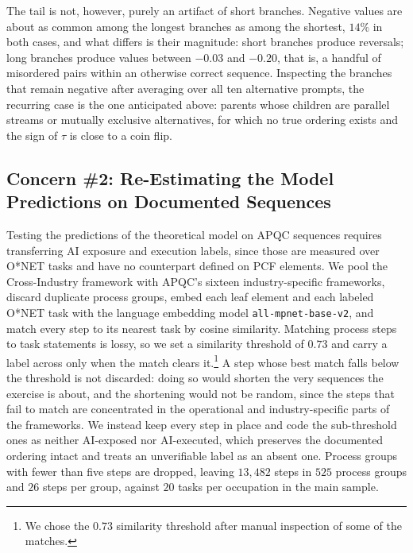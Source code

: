 The tail is not, however, purely an artifact of short branches.
Negative values are about as common among the longest branches as among the shortest, $14\%$ in both cases, and what differs is their magnitude: short branches produce reversals; long branches produce values between $-0.03$ and $-0.20$, that is, a handful of misordered pairs within an otherwise correct sequence.
Inspecting the branches that remain negative after averaging over all ten alternative prompts, the recurring case is the one anticipated above: parents whose children are parallel streams or mutually exclusive alternatives, for which no true ordering exists and the sign of $\tau$ is close to a coin flip.

\subsection{Concern \#2: Re-Estimating the Model Predictions on Documented Sequences}
\label{app:apqc_fragmentation_top}

Testing the predictions of the theoretical model on APQC sequences requires transferring AI exposure and execution labels, since those are measured over O*NET tasks and have no counterpart defined on PCF elements.
We pool the Cross-Industry framework with APQC's sixteen industry-specific frameworks, discard duplicate
process groups, embed each leaf element and each labeled O*NET task with the language embedding model \texttt{all-mpnet-base-v2}, and match every step to its nearest task by cosine similarity.
Matching process steps to task statements is lossy, so we set a similarity threshold of $0.73$ and carry a
label across only when the match clears it.\footnote{We chose the $0.73$ similarity threshold after manual inspection of some of the matches.}
A step whose best match falls below the threshold is not discarded: doing so would shorten the very sequences
the exercise is about, and the shortening would not be random, since the steps that fail to match are
concentrated in the operational and industry-specific parts of the frameworks.
We instead keep every step in place and code the sub-threshold ones as neither AI-exposed nor AI-executed,
which preserves the documented ordering intact and treats an unverifiable label as an absent one.
Process groups with fewer than five steps are dropped, leaving $13{,}482$ steps in $525$ process groups and
$26$ steps per group, against $20$ tasks per occupation in the main sample.

